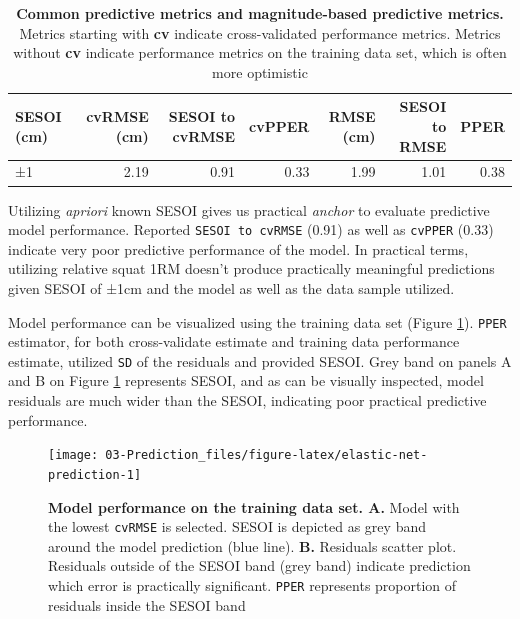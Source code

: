 \documentclass[
]{book}
\begin{document}
\begin{table}

\caption{\label{tab:predictive-metrics-mag-based}\textbf{Common predictive metrics and magnitude-based predictive metrics. }Metrics starting with \textbf{cv} indicate cross-validated performance metrics. Metrics without \textbf{cv} indicate performance metrics on the training data set, which is often more optimistic}
\centering
\begin{tabular}[t]{lrrrrrr}
\toprule
SESOI (cm) & cvRMSE (cm) & SESOI to cvRMSE & cvPPER & RMSE (cm) & SESOI to RMSE & PPER\\
\midrule
±1 & 2.19 & 0.91 & 0.33 & 1.99 & 1.01 & 0.38\\
\bottomrule
\end{tabular}
\end{table}

Utilizing \emph{apriori} known SESOI gives us practical \emph{anchor} to evaluate predictive model performance. Reported \texttt{SESOI\ to\ cvRMSE} (0.91) as well as \texttt{cvPPER} (0.33) indicate very poor predictive performance of the model. In practical terms, utilizing relative squat 1RM doesn't produce practically meaningful predictions given SESOI of ±1cm and the model as well as the data sample utilized.

Model performance can be visualized using the training data set (Figure \ref{fig:elastic-net-prediction}). \texttt{PPER} estimator, for both cross-validate estimate and training data performance estimate, utilized \texttt{SD} of the residuals and provided SESOI. Grey band on panels A and B on Figure \ref{fig:elastic-net-prediction} represents SESOI, and as can be visually inspected, model residuals are much wider than the SESOI, indicating poor practical predictive performance.

\begin{figure}

{\centering \texttt{[image: 03-Prediction\_files/figure-latex/elastic-net-prediction-1]} 

}

\caption{\textbf{Model performance on the training data set. A. }Model with the lowest \texttt{cvRMSE} is selected. SESOI is depicted as grey band around the model prediction (blue line). \textbf{B.} Residuals scatter plot. Residuals outside of the SESOI band (grey band) indicate prediction which error is practically significant. \texttt{PPER} represents proportion of residuals inside the SESOI band}\label{fig:elastic-net-prediction}
\end{figure}
\end{document}
